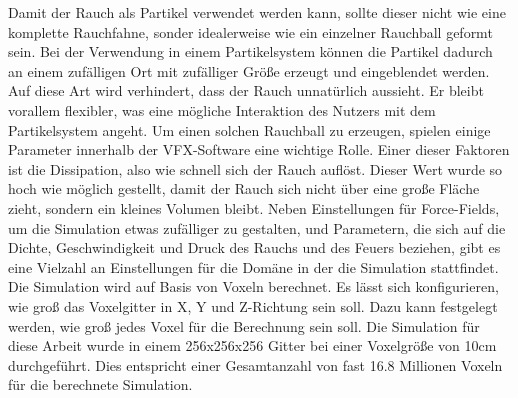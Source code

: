 Damit der Rauch als Partikel verwendet werden kann, sollte dieser nicht wie eine komplette Rauchfahne, sonder idealerweise wie ein einzelner Rauchball geformt sein.
Bei der Verwendung in einem Partikelsystem können die Partikel dadurch an einem zufälligen Ort mit zufälliger Größe erzeugt und eingeblendet werden. Auf diese
Art wird verhindert, dass der Rauch unnatürlich aussieht. Er bleibt vorallem flexibler, was eine mögliche Interaktion des Nutzers mit dem Partikelsystem angeht.
Um einen solchen Rauchball zu erzeugen, spielen einige Parameter innerhalb der VFX-Software eine wichtige Rolle. Einer dieser Faktoren ist die Dissipation, also
wie schnell sich der Rauch auflöst. Dieser Wert wurde so hoch wie möglich gestellt, damit der Rauch sich nicht über eine große Fläche zieht, sondern ein kleines Volumen
bleibt. Neben Einstellungen für Force-Fields, um die Simulation etwas zufälliger zu gestalten, und Parametern, die sich auf die Dichte, Geschwindigkeit und Druck des Rauchs
und des Feuers beziehen, gibt es eine Vielzahl an Einstellungen für die Domäne in der die Simulation stattfindet. Die Simulation wird auf Basis von Voxeln berechnet.
Es lässt sich konfigurieren, wie groß das Voxelgitter in X, Y und Z-Richtung sein soll. Dazu kann festgelegt werden, wie groß jedes Voxel für die Berechnung sein soll.
Die Simulation für diese Arbeit wurde in einem 256x256x256 Gitter bei einer Voxelgröße von 10cm durchgeführt. Dies entspricht einer Gesamtanzahl von fast 16.8 Millionen Voxeln
für die berechnete Simulation.


